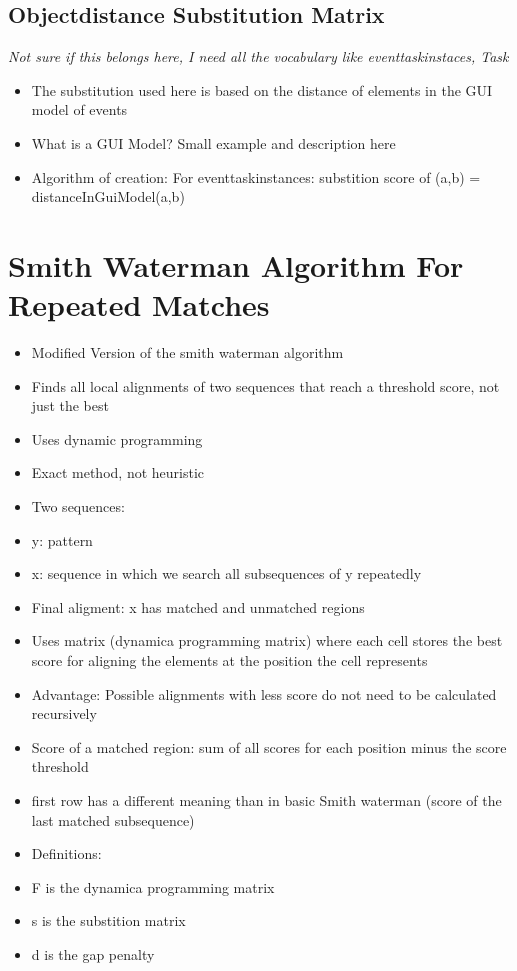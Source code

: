 \subsection{Objectdistance Substitution Matrix}
\textit{Not sure if this belongs here, I need all the vocabulary  like eventtaskinstaces, Task}
\begin{itemize}
	\item The substitution used here is based on the distance of elements in the GUI model of events
	\item What is a GUI Model? Small example and description here
	\item Algorithm of creation: For eventtaskinstances:  substition score of (a,b) = distanceInGuiModel(a,b) 
\end{itemize}

\section{Smith Waterman Algorithm For Repeated Matches}
\begin{itemize}
	\item Modified Version of the smith waterman algorithm
	\item Finds all local alignments of two sequences that reach a threshold score, not just the best
	\item Uses dynamic programming
	\item Exact method, not heuristic
	\item Two sequences: 
	\item y: pattern
	\item x: sequence in which we search all subsequences of y repeatedly
	\item Final aligment: x has matched and unmatched regions
	\item Uses matrix (dynamica programming matrix) where each cell stores the best score for aligning the elements at the position the cell represents
	\item Advantage: Possible alignments with less score do not need to be calculated recursively
	\item Score of a matched region: sum of all scores for each position minus the score threshold 
	\item first row has a different meaning than in basic Smith waterman (score of the last matched subsequence)
	\item Definitions:
	\item F is the dynamica programming matrix
	\item s is the substition matrix
	\item d is the gap penalty
\end{itemize}

